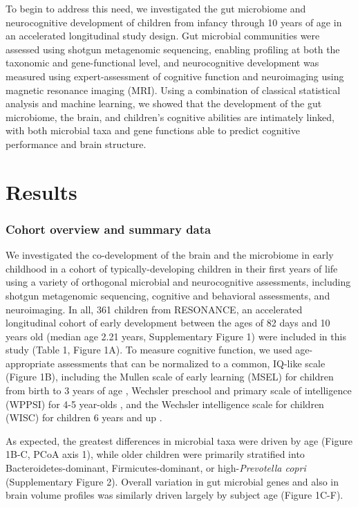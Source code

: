 \documentclass[a4paper]{article}
\begin{document}
To begin to address this need, we investigated the gut microbiome and
neurocognitive development of children from infancy through 10 years of
age in an accelerated longitudinal study design. Gut microbial
communities were assessed using shotgun metagenomic sequencing, enabling
profiling at both the taxonomic and gene-functional level, and
neurocognitive development was measured using expert-assessment of
cognitive function and neuroimaging using magnetic resonance imaging
(MRI). Using a combination of classical statistical analysis and machine
learning, we showed that the development of the gut microbiome, the
brain, and children's cognitive abilities are intimately linked, with
both microbial taxa and gene functions able to predict cognitive
performance and brain structure.

\section*{Results}

\subsubsection{Cohort overview and summary data}

We investigated the co-development of the brain and the microbiome in
early childhood in a cohort of typically-developing children in their
first years of life using a variety of orthogonal microbial and
neurocognitive assessments, including shotgun metagenomic sequencing,
cognitive and behavioral assessments, and neuroimaging. In all, 361
children from RESONANCE,
an accelerated longitudinal cohort of early development
between the ages of 82 days and 10 years
old (median age 2.21 years, Supplementary Figure 1) were included in
this study (Table 1, Figure 1A). To measure cognitive function, we used
age-appropriate assessments that can be normalized to a common, IQ-like
scale (Figure 1B), including the Mullen scale of early learning (MSEL)
for children from birth to 3 years of age
\citep{mullenMullenScalesEarly1995},
Wechsler preschool and primary scale of intelligence (WPPSI)
for 4-5 year-olds
\citep{wechslerWechslerPreschoolPrimary2012},
and the Wechsler intelligence scale for children (WISC)
for children 6 years and up
\citep{wechslerWechslerIntelligenceScale1949}.

As expected, the greatest differences in microbial taxa were driven by
age (Figure 1B-C, PCoA axis 1), while older children were primarily
stratified into Bacteroidetes-dominant, Firmicutes-dominant, or
high-\emph{Prevotella copri} (Supplementary Figure 2). Overall variation
in gut microbial genes and also in brain volume profiles was similarly
driven largely by subject age (Figure 1C-F).
\end{document}
